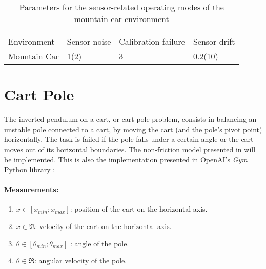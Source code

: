 \documentclass{article}
\begin{document}
\begin{table}[h!]
  \caption{Parameters for the sensor-related operating modes of the mountain car environment}
  \label{tbl::SensorAnomalMountainCar}
  \begin{center}
  \begin{tabular}{l|l|l|l|}
      & \multicolumn{3}{c}{} \\
  Environment & Sensor noise & Calibration failure & Sensor drift \\
   \hline
   Mountain Car & 1(2)& 3 & 0.2(10) \\
   \hline
  \end{tabular}
  \end{center}
\end{table}

%
%

\section{Cart Pole}
The inverted pendulum on a cart, or cart-pole problem, consists in balancing an unstable pole connected to a cart, by moving the cart (and the pole's pivot point) horizontally. The task is failed if the pole falls under a certain angle or the cart moves out of its horizontal boundaries. The non-friction model presented in \cite{Florian2007} will be implemented. This is also the implementation presented in OpenAI's \emph{Gym} Python library \cite{Brockman2016}:

\paragraph{Measurements:}

\begin{enumerate}
\item $x \in [x_{min}; x_{max}] $: position of the cart on the horizontal axis.
\item $\dot{x} \in \Re $: velocity of the cart on the horizontal axis.
\item $\theta \in [\theta_{min}; \theta_{max}]$ : angle of the pole.
\item $\dot{\theta} \in \Re$: angular velocity of the pole.
\end{enumerate}
\end{document}
